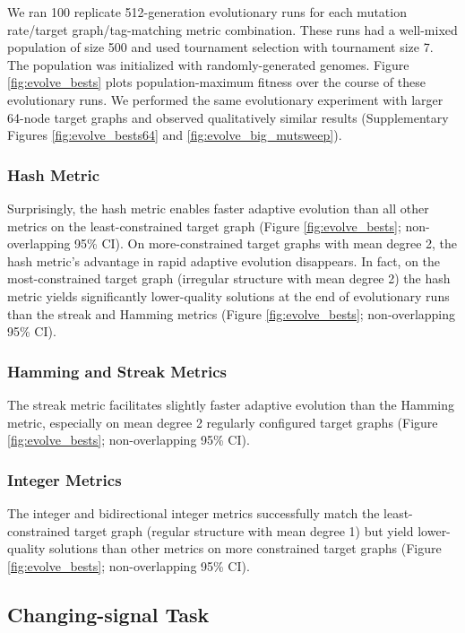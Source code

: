 We ran 100 replicate 512-generation evolutionary runs for each mutation rate/target graph/tag-matching metric combination.
These runs had a well-mixed population of size 500 and used tournament selection with tournament size 7.
The population was initialized with randomly-generated genomes.
Figure \ref{fig:evolve_bests} plots population-maximum fitness over the course of these evolutionary runs.
We performed the same evolutionary experiment with larger 64-node target graphs and observed qualitatively similar results (Supplementary Figures \ref{fig:evolve_bests64} and \ref{fig:evolve_big_mutsweep}).

\subsubsection{Hash Metric}

Surprisingly, the hash metric enables faster adaptive evolution than all other metrics on the least-constrained target graph (Figure \ref{fig:evolve_bests}; non-overlapping 95\% CI).
On more-constrained target graphs with mean degree 2, the hash metric's advantage in rapid adaptive evolution disappears.
In fact, on the most-constrained target graph (irregular structure with mean degree 2) the hash metric yields significantly lower-quality solutions at the end of evolutionary runs than the streak and Hamming metrics (Figure \ref{fig:evolve_bests}; non-overlapping 95\% CI).

\subsubsection{Hamming and Streak Metrics}

The streak metric facilitates slightly faster adaptive evolution than the Hamming metric, especially on mean degree 2 regularly configured target graphs (Figure \ref{fig:evolve_bests}; non-overlapping 95\% CI).

\subsubsection{Integer Metrics}

The integer and bidirectional integer metrics successfully match the least-constrained target graph (regular structure with mean degree 1) but yield lower-quality solutions than other metrics on more constrained target graphs (Figure \ref{fig:evolve_bests}; non-overlapping 95\% CI).


\subsection{Changing-signal Task} \label{sec:changing-signal}

